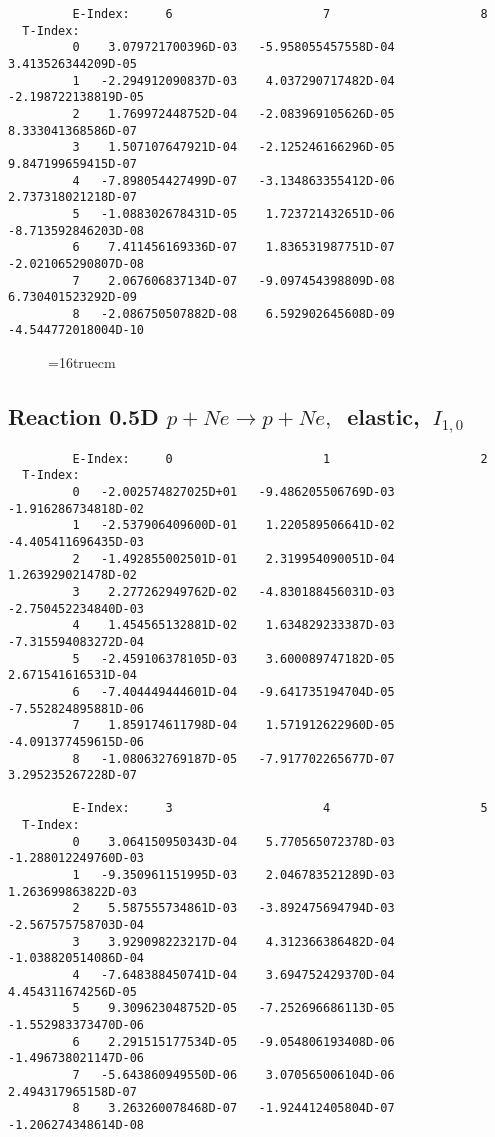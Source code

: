 \documentclass[12pt,dvipdfmx]{article}
\begin{document}
{\begin{small}
\begin{verbatim}
         E-Index:     6                     7                     8
  T-Index:
         0    3.079721700396D-03   -5.958055457558D-04    3.413526344209D-05
         1   -2.294912090837D-03    4.037290717482D-04   -2.198722138819D-05
         2    1.769972448752D-04   -2.083969105626D-05    8.333041368586D-07
         3    1.507107647921D-04   -2.125246166296D-05    9.847199659415D-07
         4   -7.898054427499D-07   -3.134863355412D-06    2.737318021218D-07
         5   -1.088302678431D-05    1.723721432651D-06   -8.713592846203D-08
         6    7.411456169336D-07    1.836531987751D-07   -2.021065290807D-08
         7    2.067606837134D-07   -9.097454398809D-08    6.730401523292D-09
         8   -2.086750507882D-08    6.592902645608D-09   -4.544772018004D-10
\end{verbatim}\end{small}


\begin{figure} \label{0.5T}
\epsfxsize=16truecm
\end{figure}
\newpage

\subsection{
Reaction 0.5D  $p + Ne \rightarrow p + Ne ,\ $
 elastic, $\  I_{1,0}$
}

\begin{small}\begin{verbatim}
         E-Index:     0                     1                     2
  T-Index:
         0   -2.002574827025D+01   -9.486205506769D-03   -1.916286734818D-02
         1   -2.537906409600D-01    1.220589506641D-02   -4.405411696435D-03
         2   -1.492855002501D-01    2.319954090051D-04    1.263929021478D-02
         3    2.277262949762D-02   -4.830188456031D-03   -2.750452234840D-03
         4    1.454565132881D-02    1.634829233387D-03   -7.315594083272D-04
         5   -2.459106378105D-03    3.600089747182D-05    2.671541616531D-04
         6   -7.404449444601D-04   -9.641735194704D-05   -7.552824895881D-06
         7    1.859174611798D-04    1.571912622960D-05   -4.091377459615D-06
         8   -1.080632769187D-05   -7.917702265677D-07    3.295235267228D-07

         E-Index:     3                     4                     5
  T-Index:
         0    3.064150950343D-04    5.770565072378D-03   -1.288012249760D-03
         1   -9.350961151995D-03    2.046783521289D-03    1.263699863822D-03
         2    5.587555734861D-03   -3.892475694794D-03   -2.567575758703D-04
         3    3.929098223217D-04    4.312366386482D-04   -1.038820514086D-04
         4   -7.648388450741D-04    3.694752429370D-04    4.454311674256D-05
         5    9.309623048752D-05   -7.252696686113D-05   -1.552983373470D-06
         6    2.291515177534D-05   -9.054806193408D-06   -1.496738021147D-06
         7   -5.643860949550D-06    3.070565006104D-06    2.494317965158D-07
         8    3.263260078468D-07   -1.924412405804D-07   -1.206274348614D-08


\end{verbatim}
\end{small}}
\end{document}
